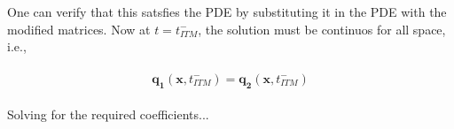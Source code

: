 One can verify that this satsfies the PDE by substituting it in the PDE with the modified matrices. Now at $t=t_{ITM}^-$, the solution must be continuos for all space, i.e.,

\begin{align}
    \begin{split}
    \mathbf{q_1}\left(\mathbf{x}, t_{ITM}^-\right) = \mathbf{q_2}\left(\mathbf{x}, t_{ITM}^-\right)
    \end{split}
\end{align}

Solving for the required coefficients...